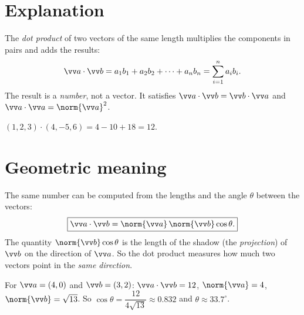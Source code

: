 \label{ch:dotproduct}

\section*{Explanation}
The \emph{dot product} of two vectors of the same length multiplies the components in pairs and adds the results:
\[
\vv a\cdot\vv b=a_1b_1+a_2b_2+\dots+a_nb_n=\sum_{i=1}^n a_ib_i.
\]
The result is a \emph{number}, not a vector. It satisfies $\vv a\cdot\vv b=\vv b\cdot\vv a$ and $\vv a\cdot\vv a=\norm{\vv a}^2$.

\begin{example}
$(1,2,3)\cdot(4,-5,6)=4-10+18=12$.
\end{example}

\section*{Geometric meaning}
The same number can be computed from the lengths and the angle $\theta$ between the vectors:
\[
\boxed{\vv a\cdot\vv b=\norm{\vv a}\,\norm{\vv b}\cos\theta.}
\]
The quantity $\norm{\vv b}\cos\theta$ is the length of the shadow (the \emph{projection}) of $\vv b$ on the direction of $\vv a$. So the dot product measures how much two vectors point in the \emph{same direction}.

\begin{center}

\label{fig:b3_4}
\end{center}

\begin{example}
For $\vv a=(4,0)$ and $\vv b=(3,2)$: $\vv a\cdot\vv b=12$, $\norm{\vv a}=4$, $\norm{\vv b}=\sqrt{13}$. So $\cos\theta=\dfrac{12}{4\sqrt{13}}\approx0.832$ and $\theta\approx33.7^\circ$.
\end{example}

